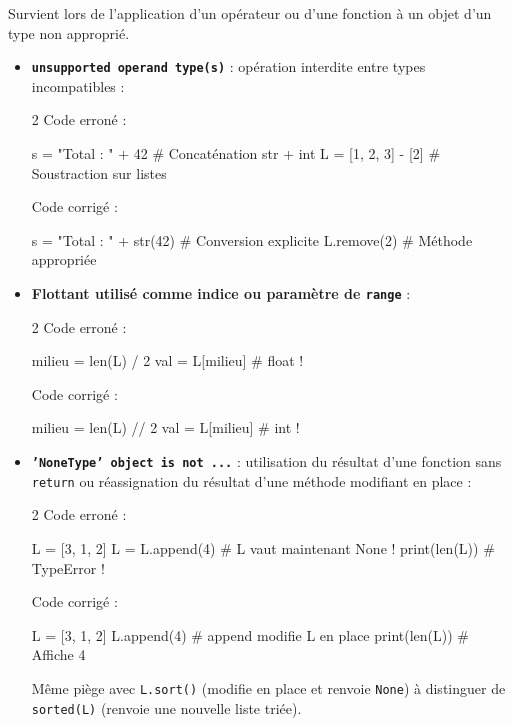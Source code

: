 \documentclass[11pt,a4paper]{article}
\begin{document}
\begin{tcolorbox}[left=0cm,title=\bf{\faBug \; 3. Erreurs de type (TypeError)},colbacktitle=cfond]
Survient lors de l'application d'un opérateur ou d'une fonction à un objet d'un type non approprié.
\begin{itemize}
	\item[\textbullet] \textbf{\texttt{unsupported operand type(s)}} : opération interdite entre types incompatibles :
	\setlength{\multicolsep}{0pt}
	\begin{multicols}{2}
		\textcolor{BrickRed}{\faTimesCircle \; Code erroné :}
		\begin{python}
s = "Total : " + 42
# Concaténation str + int
L = [1, 2, 3] - [2]
# Soustraction sur listes
		\end{python}
		\textcolor{OliveGreen}{\faCheckCircle \; Code corrigé :}
		\begin{python}
s = "Total : " + str(42)
# Conversion explicite
L.remove(2)
# Méthode appropriée
		\end{python}
	\end{multicols}

	\item[\textbullet] \textbf{Flottant utilisé comme indice ou paramètre de \texttt{range}} :
	\begin{multicols}{2}
		\textcolor{BrickRed}{\faTimesCircle \; Code erroné :}
		\begin{python}
milieu = len(L) / 2
val = L[milieu] # float !
		\end{python}
		\textcolor{OliveGreen}{\faCheckCircle \; Code corrigé :}
		\begin{python}
milieu = len(L) // 2
val = L[milieu] # int !
		\end{python}
	\end{multicols}

	\item[\textbullet] \textbf{\texttt{'NoneType' object is not ...}} : utilisation du résultat d'une fonction sans \texttt{return} ou réassignation du résultat d'une méthode modifiant en place :
	\begin{multicols}{2}
		\textcolor{BrickRed}{\faTimesCircle \; Code erroné :}
		\begin{python}
L = [3, 1, 2]
L = L.append(4)
# L vaut maintenant None !
print(len(L)) # TypeError !
		\end{python}
		\textcolor{OliveGreen}{\faCheckCircle \; Code corrigé :}
		\begin{python}
L = [3, 1, 2]
L.append(4)
# append modifie L en place
print(len(L)) # Affiche 4
		\end{python}
	\end{multicols}
	{\small \danger} Même piège avec \texttt{L.sort()} (modifie en place et renvoie \texttt{None}) à distinguer de \texttt{sorted(L)} (renvoie une nouvelle liste triée).


\end{itemize}
\end{tcolorbox}
\end{document}
